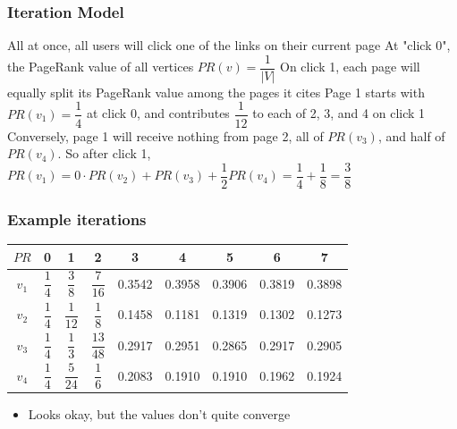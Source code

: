 \documentclass{beamer}
\begin{document}
\begin{frame}[t]
\frametitle{Iteration Model}
\begin{outline}
    \1 All at once, all users will click one of the links on their current page
    \1 At "click 0", the PageRank value of all vertices $PR(v) = \dfrac{1}{|V|}$
    \1 On click 1, each page will equally split its PageRank value among the pages it cites
    \1 Page 1 starts with $PR(v_1) = \dfrac{1}{4}$ at click 0, and contributes $\dfrac{1}{12}$ to each of 2, 3, and 4 on click 1
    \1 Conversely, page 1 will receive nothing from page 2, all of $PR(v_3)$, and half of $PR(v_4)$. So after click 1, $PR(v_1) = 0\cdot PR(v_2) + PR(v_3) + \dfrac{1}{2}PR(v_4) = \dfrac{1}{4} + \dfrac{1}{8} = \dfrac{3}{8}$
\end{outline}
\end{frame}

\begin{frame}
\frametitle{Example iterations}
\bgroup
\def\arraystretch{2.5}
\begin{tabular}{|c|c|c|c|c|c|c|c|c|}
    \hline
    $PR$ & 0 & 1 & 2 & 3 & 4 & 5 & 6 & 7\\
    \hline
    $v_1$ & $\dfrac{1}{4}$ & $\dfrac{3}{8}$ & $\dfrac{7}{16}$ & 0.3542 & 0.3958 & 0.3906& 0.3819 & 0.3898\\
    $v_2$ & $\dfrac{1}{4}$ & $\dfrac{1}{12}$ & $\dfrac{1}{8}$ & 0.1458 & 0.1181 & 0.1319& 0.1302 & 0.1273\\
    $v_3$ & $\dfrac{1}{4}$ & $\dfrac{1}{3}$ & $\dfrac{13}{48}$ & 0.2917 & 0.2951 & 0.2865& 0.2917 & 0.2905\\
    $v_4$ & $\dfrac{1}{4}$ & $\dfrac{5}{24}$ & $\dfrac{1}{6}$ & 0.2083 & 0.1910 & 0.1910 & 0.1962 & 0.1924\\
    \hline
\end{tabular}
\egroup
\begin{itemize}
    \item Looks okay, but the values don't quite converge
\end{itemize}
\end{frame}
\end{document}
